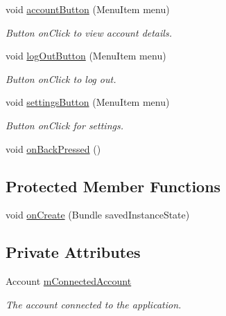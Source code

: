 \begin{DoxyCompactItemize}
void \hyperlink{classuk_1_1ac_1_1swan_1_1digitaltrails_1_1activities_1_1_home_activity_a779e60bfa94737d36c9afb4c5a77fee5}{account\+Button} (Menu\+Item menu)
\begin{DoxyCompactList}\small\item\em Button on\+Click to view account details. \end{DoxyCompactList}\item 
void \hyperlink{classuk_1_1ac_1_1swan_1_1digitaltrails_1_1activities_1_1_home_activity_a64d90984853f2cd6acef5d229a7e628a}{log\+Out\+Button} (Menu\+Item menu)
\begin{DoxyCompactList}\small\item\em Button on\+Click to log out. \end{DoxyCompactList}\item 
void \hyperlink{classuk_1_1ac_1_1swan_1_1digitaltrails_1_1activities_1_1_home_activity_a384bd7013fc6efa7e2b5ee6e64a230d0}{settings\+Button} (Menu\+Item menu)
\begin{DoxyCompactList}\small\item\em Button on\+Click for settings. \end{DoxyCompactList}\item 
void \hyperlink{classuk_1_1ac_1_1swan_1_1digitaltrails_1_1activities_1_1_home_activity_a362149a27621580122d7e8f480907558}{on\+Back\+Pressed} ()
\end{DoxyCompactItemize}
\subsection*{Protected Member Functions}
\begin{DoxyCompactItemize}
\item 
void \hyperlink{classuk_1_1ac_1_1swan_1_1digitaltrails_1_1activities_1_1_home_activity_aa39a35ebcd4ce26e55a91a78b54cf52b}{on\+Create} (Bundle saved\+Instance\+State)
\end{DoxyCompactItemize}
\subsection*{Private Attributes}
\begin{DoxyCompactItemize}
\item 
Account \hyperlink{classuk_1_1ac_1_1swan_1_1digitaltrails_1_1activities_1_1_home_activity_a42bf8dfc43613b3d67f747722caf3b9f}{m\+Connected\+Account}
\begin{DoxyCompactList}\small\item\em The account connected to the application. \end{DoxyCompactList}\end{DoxyCompactItemize}
